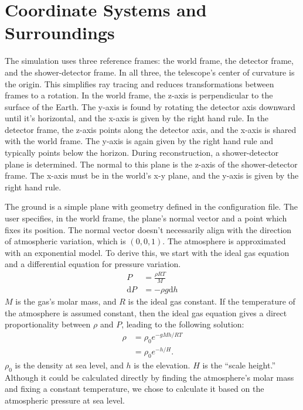 \section{Coordinate Systems and Surroundings} \label{sec:atmosphere}

The simulation uses three reference frames: the world frame, the detector frame, and the shower-detector frame. In all three, the telescope's center of curvature is the origin. This simplifies ray tracing and reduces transformations between frames to a rotation. In the world frame, the z-axis is perpendicular to the surface of the Earth. The y-axis is found by rotating the detector axis downward until it's horizontal, and the x-axis is given by the right hand rule. In the detector frame, the z-axis points along the detector axis, and the x-axis is shared with the world frame. The y-axis is again given by the right hand rule and typically points below the horizon. During reconstruction, a shower-detector plane is determined. The normal to this plane is the z-axis of the shower-detector frame. The x-axis must be in the world's x-y plane, and the y-axis is given by the right hand rule.

The ground is a simple plane with geometry defined in the configuration file. The user specifies, in the world frame, the plane's normal vector and a point which fixes its position. The normal vector doesn't necessarily align with the direction of atmospheric variation, which is $(0, 0, 1)$. The atmosphere is approximated with an exponential model. To derive this, we start with the ideal gas equation and a differential equation for pressure variation.
\begin{align}
    P &= \frac {\rho RT}{M} \\
    \text{d}P &= -\rho g \text{d}h
\end{align}
$M$ is the gas's molar mass, and $R$ is the ideal gas constant. If the temperature of the atmosphere is assumed constant, then the ideal gas equation gives a direct proportionality between $\rho$ and $P$, leading to the following solution:
\begin{equation}
\begin{aligned}
    \rho &= \rho_0 e^{-gMh / RT} \\
         &= \rho_0 e^{-h / H}.
\end{aligned}
\end{equation}
$\rho_0$ is the density at sea level, and $h$ is the elevation. $H$ is the ``scale height.'' Although it could be calculated directly by finding the atmosphere's molar mass and fixing a constant temperature, we chose to calculate it based on the atmospheric pressure at sea level.

